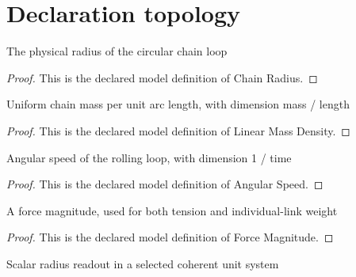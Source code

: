 \section{Declaration topology}
\begin{definition}
  \label{def:physics:phyx-mini-0244:phyxminiproblems-problemphyxmini0244-chainradius}
  The physical radius of the circular chain loop
\end{definition}
\begin{proof}
  This is the declared model definition of Chain Radius.
\end{proof}
\begin{definition}
  \label{def:physics:phyx-mini-0244:phyxminiproblems-problemphyxmini0244-linearmassdensity}
  Uniform chain mass per unit arc length, with dimension mass / length
\end{definition}
\begin{proof}
  This is the declared model definition of Linear Mass Density.
\end{proof}
\begin{definition}
  \label{def:physics:phyx-mini-0244:phyxminiproblems-problemphyxmini0244-angularspeed}
  Angular speed of the rolling loop, with dimension 1 / time
\end{definition}
\begin{proof}
  This is the declared model definition of Angular Speed.
\end{proof}
\begin{definition}
  \label{def:physics:phyx-mini-0244:phyxminiproblems-problemphyxmini0244-forcemagnitude}
  A force magnitude, used for both tension and individual-link weight
\end{definition}
\begin{proof}
  This is the declared model definition of Force Magnitude.
\end{proof}
\begin{definition}
  \label{def:physics:phyx-mini-0244:phyxminiproblems-problemphyxmini0244-radiusreadout}
  Scalar radius readout in a selected coherent unit system
\end{definition}
